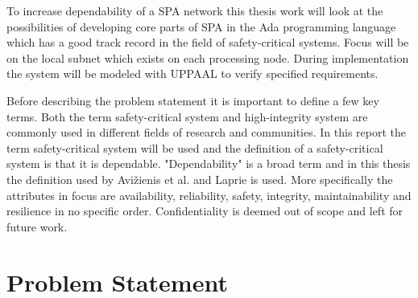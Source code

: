 To increase dependability of a SPA network this thesis work will look at the
possibilities of developing core parts of SPA in the Ada programming language
which has a good track record in the field of safety-critical systems. Focus
will be on the local subnet which exists on each processing node.
During implementation the system will be modeled with UPPAAL to verify
specified requirements.

Before describing the problem statement it is important to define a few key
terms. Both the term safety-critical system and high-integrity system are
commonly used in different fields of research and communities. In this report
the term safety-critical system will be used and the definition of a
safety-critical system is that it is dependable.  "Dependability" is a broad
term and in this thesis the definition used by Avi\v{z}ienis et al.
\cite{avizienis2004} and Laprie \cite{laprie2008} is used. More specifically the
attributes in focus are availability, reliability, safety, integrity,
maintainability and resilience in no specific order. Confidentiality is deemed
out of scope and left for future work.

\section{Problem Statement}
% 
% 


